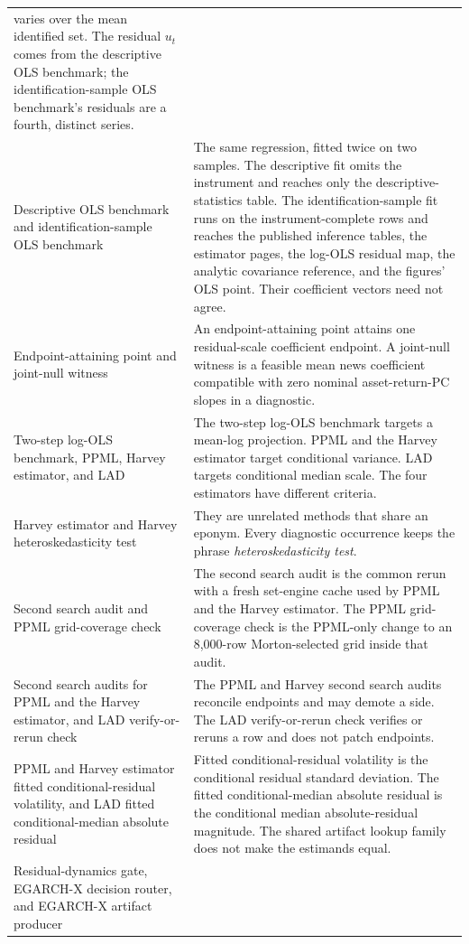 \documentclass[11pt]{article}
\begin{document}
\begin{longtable}{@{}>{\raggedright\arraybackslash}p{}
  >{\raggedright\arraybackslash}p{}@{}}
varies over the mean identified set. The residual $u_t$ comes from the
descriptive OLS benchmark; the identification-sample OLS benchmark's residuals
are a fourth, distinct series.\\
Descriptive OLS benchmark and identification-sample OLS benchmark & The same
regression, fitted twice on two samples. The descriptive fit omits the
instrument and reaches only the descriptive-statistics table. The
identification-sample fit runs on the instrument-complete rows and reaches the
published inference tables, the estimator pages, the log-OLS residual map, the
analytic covariance reference, and the figures' OLS point. Their coefficient
vectors need not agree.\\
Endpoint-attaining point and joint-null witness & An endpoint-attaining point
attains one residual-scale coefficient endpoint. A joint-null witness is a
feasible mean news coefficient compatible with zero nominal asset-return-PC
slopes in a diagnostic.\\
Two-step log-OLS benchmark, PPML, Harvey estimator, and LAD & The two-step
log-OLS benchmark targets a mean-log projection. PPML and the Harvey estimator
target conditional variance. LAD targets conditional median scale. The four
estimators have different criteria.\\
Harvey estimator and Harvey heteroskedasticity test & They are unrelated methods
that share an eponym. Every diagnostic occurrence keeps the phrase
\emph{heteroskedasticity test}.\\
Second search audit and PPML grid-coverage check & The second search audit is the
common rerun with a fresh set-engine cache used by PPML and the Harvey estimator.
The PPML grid-coverage check is the PPML-only change to an 8,000-row
Morton-selected grid inside that audit.\\
Second search audits for PPML and the Harvey estimator, and LAD verify-or-rerun
check & The PPML and Harvey second search audits reconcile endpoints and may
demote a side. The LAD verify-or-rerun check verifies or reruns a row and does
not patch endpoints.\\
PPML and Harvey estimator fitted conditional-residual volatility, and LAD fitted
conditional-median absolute residual & Fitted conditional-residual volatility is the conditional
residual standard deviation. The fitted conditional-median absolute residual is the conditional
median absolute-residual magnitude. The shared artifact lookup family does not
make the estimands equal.\\
Residual-dynamics gate, EGARCH-X decision router, and EGARCH-X artifact producer &

\end{longtable}
\end{document}
